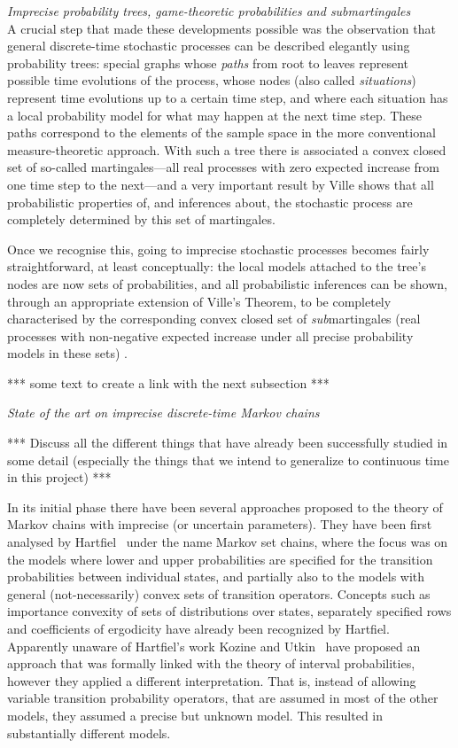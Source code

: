 \documentclass[11pt,dvipsnames,usenames,a4paper]{article}
\begin{document}
\vspace{5pt}
\emph{Imprecise probability trees, game-theoretic probabilities and submartingales}\\[5pt]
A crucial step that made these developments possible was the observation that general discrete-time stochastic processes can be described elegantly using probability trees: special graphs whose \emph{paths} from root to leaves represent possible time evolutions of the process, whose nodes (also called \emph{situations}) represent time evolutions up to a certain time step, and where each situation has a local probability model for what may happen at the next time step.
These paths correspond to the elements of the sample space in the more conventional measure-theoretic approach.
With such a tree there is associated a convex closed set of so-called martingales---all real processes with zero expected increase from one time step to the next---and a very important result by Ville \cite{ville1939,shafer2001} shows that all probabilistic properties of, and inferences about, the stochastic process are completely determined by this set of martingales.

Once we recognise this, going to imprecise stochastic processes becomes fairly straightforward, at least conceptually: the local models attached to the tree's nodes are now sets of probabilities, and all probabilistic inferences can be shown, through an appropriate extension of Ville's Theorem, to be completely characterised by the corresponding convex closed set of \emph{sub}martingales (real processes with non-negative expected increase under all precise probability models in these sets) \cite{cooman2007d,cooman2015:markovergodic}.

*** some text to create a link with the next subsection ***

\emph{State of the art on imprecise discrete-time Markov chains}

*** Discuss all the different things that have already been successfully studied in some detail (especially the things that we intend to generalize to continuous time in this project) ***

In its initial phase there have been several approaches proposed to the theory of Markov chains with imprecise (or uncertain parameters). They have been first analysed by Hartfiel~\cite{hartfiel1998} under the name Markov set chains, where the focus was on the models where lower and upper probabilities are specified for the transition probabilities between individual states, and partially also to the models with general (not-necessarily) convex sets of transition operators. Concepts such as importance convexity of sets of distributions over states, separately specified rows and coefficients of ergodicity have already been recognized by Hartfiel. Apparently unaware of Hartfiel's work Kozine and Utkin~\cite{utkin:02} have proposed an approach that was formally linked with the theory of interval probabilities, however they applied a different interpretation. That is, instead of allowing variable transition probability operators, that are assumed in most of the other models, they assumed a precise but unknown model. This resulted in substantially different models. 
\end{document}
